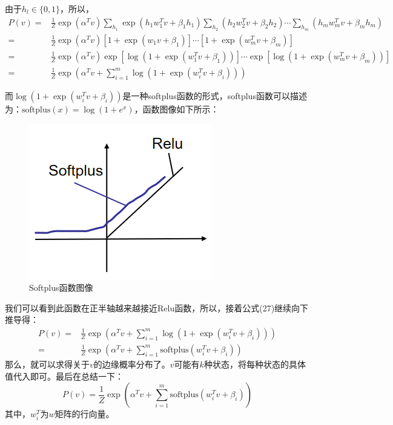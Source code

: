 \documentclass[a4paper]{article}
\begin{document}
由于$h_l \in\{0,1\}$，所以，
\begin{equation}
\begin{split}
    P(v) = &\frac{1}{Z} \exp(\alpha^T v) \sum_{h_1}\exp (h_1w_1^{T}v + \beta_1 h_1) \sum_{h_2}(h_2w_2^{T}v + \beta_2 h_2) \cdots \sum_{h_m}(h_mw_m^{T}v + \beta_m h_m) \\
    = &\frac{1}{Z} \exp(\alpha^T v) \left[ 1+\exp(w_1v+\beta_1) \right]\cdots \left[ 1+\exp(w_m^{T}v+\beta_m) \right] \\
    = & \frac{1}{Z} \exp(\alpha^T v) \exp \left[\log ( 1+\exp(w_1^{T}v+\beta_1)) \right]\cdots \exp \left[\log ( 1+\exp(w_m^{T}v+\beta_m)) \right] \\
    = & \frac{1}{Z} \exp\left(\alpha^T v + \sum_{i=1}^m \log ( 1+\exp(w_i^{T}v+\beta_i)) \right)
\end{split}
\end{equation}

而$\log ( 1+\exp(w_i^{T}v+\beta_i))$是一种softplus函数的形式，softplus函数可以描述为：$\mathrm{softplus}(x) = \log(1+e^x)$，函数图像如下所示：
\begin{figure}[H]
    \centering
    \includegraphics[width=.45\textwidth]{微信图片_20200301132709.png}
    \caption{Softplus函数图像}
\end{figure}
我们可以看到此函数在正半轴越来越接近Relu函数，所以，接着公式(27)继续向下推导得：
\begin{equation}
\begin{split}
    P(v) = & \frac{1}{Z} \exp\left(\alpha^T v + \sum_{i=1}^m \log ( 1+\exp(w_i^Tv+\beta_i)) \right) \\
    = &\frac{1}{Z} \exp\left(\alpha^T v + \sum_{i=1}^m \mathrm{softplus} ( w_i^Tv+\beta_i) \right)
\end{split}
\end{equation}
那么，就可以求得关于$v$的边缘概率分布了。$v$可能有$k$种状态，将每种状态的具体值代入即可。最后在总结一下：
\begin{equation}
    P(v)
    = \frac{1}{Z} \exp\left(\alpha^T v + \sum_{i=1}^m \mathrm{softplus} ( w_i^Tv+\beta_i) \right)
\end{equation}
其中，$w_i^T$为$w$矩阵的行向量。
\end{document}

